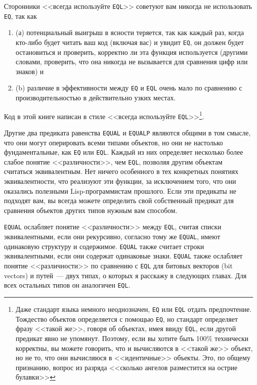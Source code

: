 Сторонники <<всегда используйте \lstinline{EQL}>> советуют вам никогда не использовать
\lstinline{EQ}, так как

\begin{enumerate}
\item (а) потенциальный выигрыш в ясности теряется, так как каждый раз, когда кто-либо
  будет читать ваш код (включая вас) и увидит \lstinline{EQ}, он должен будет остановиться и
  проверить, корректно ли эта функция используется (другими словами, проверить, что она
  никогда не вызывается для сравнения цифр или знаков) и
\item (b) различие в эффективности между \lstinline{EQ} и \lstinline{EQL} очень мало по
  сравнению с производительностью в действительно узких местах.
\end{enumerate}

Код в этой книге написан в стиле <<всегда используйте \lstinline{EQL}>>\footnote{Даже стандарт
  языка немного неоднозначен, \lstinline{EQ} или \lstinline{EQL} отдать предпочтение. Тождество
  объектов определяется с помощью \lstinline{EQ}, но стандарт определяет фразу <<такой же>>,
  говоря об объектах, имея ввиду \lstinline{EQL}, если другой предикат явно не
  упомянут. Поэтому, если вы хотите быть 100\% технически корректны, вы можете говорить,
  что  и  вычисляются в <<такой же>> объект, но не то, что они
  вычисляюся в <<идентичные>> объекты. Это, по общему признанию, вопрос из разряда <<сколько
  ангелов разместится на острие булавки>>}.

Другие два предиката равенства \lstinline{EQUAL} и \lstinline{EQUALP} являются общими в том
смысле, что они могут оперировать всеми типами объектов, но они не настолько
фундаментальные, как \lstinline{EQ} или \lstinline{EQL}. Каждый из них определяет несколько
более слабое понятие <<различности>>, чем \lstinline{EQL}, позволяя другим объектам считаться
эквивалентным. Нет ничего особенного в тех конкретных понятиях эквивалентности, что
реализуют эти функции, за исключением того, что они оказались полезными Lisp-программистам
прошлого. Если эти предикаты не подходят вам, вы всегда можете определить свой собственный
предикат для сравнения объектов других типов нужным вам способом.

\lstinline{EQUAL} ослабляет понятие <<различности>> между \lstinline{EQL}, считая списки
эквивалентными, если они рекурсивно, согласно тому же \lstinline{EQUAL}, имеют одинаковую
структуру и содержимое. \lstinline{EQUAL} также считает строки эквивалентными, если они
содержат одинаковые знаки. \lstinline{EQUAL} также ослабляет понятие <<различности>> по
сравнению с \lstinline{EQL} для битовых векторов (bit vectors) и путей~--- двух типах, о
которых я расскажу в следующих главах. Для всех остальных типов он аналогичен
\lstinline{EQL}.

